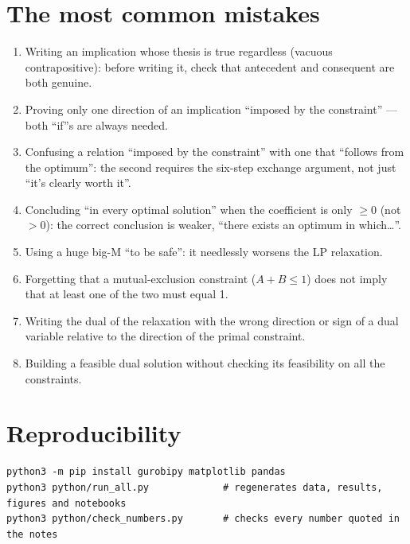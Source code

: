 \section{The most common mistakes}
\begin{enumerate}
\item Writing an implication whose thesis is true regardless (vacuous
      contrapositive): before writing it, check that antecedent and
      consequent are both genuine.
\item Proving only one direction of an implication ``imposed by the
      constraint'' --- both ``if''s are always needed.
\item Confusing a relation ``imposed by the constraint'' with one that
      ``follows from the optimum'': the second requires the six-step
      exchange argument, not just ``it's clearly worth it''.
\item Concluding ``in every optimal solution'' when the coefficient is only
      $\ge 0$ (not $>0$): the correct conclusion is weaker, ``there exists an
      optimum in which\ldots''.
\item Using a huge big-M ``to be safe'': it needlessly worsens the LP
      relaxation.
\item Forgetting that a mutual-exclusion constraint ($A+B\le 1$) does not
      imply that at least one of the two must equal 1.
\item Writing the dual of the relaxation with the wrong direction or sign of
      a dual variable relative to the direction of the primal constraint.
\item Building a feasible dual solution without checking its feasibility on
      all the constraints.
\end{enumerate}

\section{Reproducibility}
\begin{lstlisting}[style=output]
python3 -m pip install gurobipy matplotlib pandas
python3 python/run_all.py             # regenerates data, results, figures and notebooks
python3 python/check_numbers.py       # checks every number quoted in the notes
\end{lstlisting}
